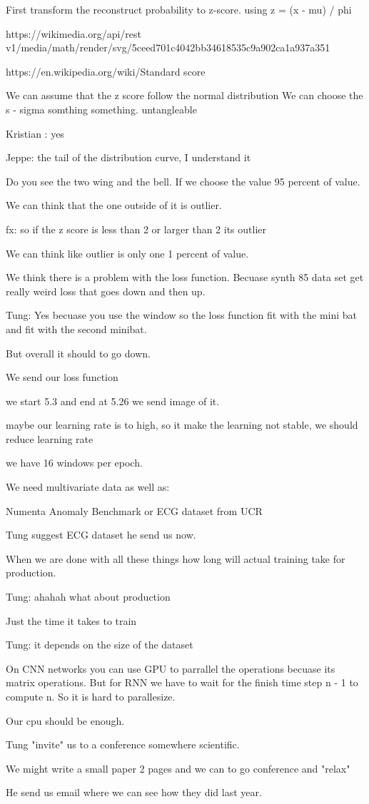 First transform the reconstruct probability to z-score. 
    using z = (x - mu) / phi
    
https://wikimedia.org/api/rest v1/media/math/render/svg/5ceed701c4042bb34618535c9a902ca1a937a351

https://en.wikipedia.org/wiki/Standard score

We can assume that the z score follow the normal distribution
We can choose the s - sigma somthing something. untangleable

Kristian : yes

Jeppe: the tail of the distribution curve, I understand it

Do you see the two wing and the bell. If we choose the value 95 percent of value.

We can think that the one outside of it is outlier.

fx: so if the z score is less than 2 or larger than 2 its outlier

We can think like outlier is only one 1 percent of value.





We think there is a problem with the loss function.
Becuase synth 85 data set get really weird loss that goes down and then up.

Tung: Yes becuase you use the window so the loss function fit with the mini bat and fit with the second minibat.

But overall it should to go down.

We send our loss function

we start 5.3 and end at 5.26 we send image of it. 

maybe our learning rate is to high, so it make the learning not stable, we should reduce learning rate

we have 16 windows per epoch.

We need multivariate data as well as:

Numenta Anomaly Benchmark
or ECG dataset from UCR

Tung suggest ECG dataset he send us now.


When we are done with all these things how long will actual training take for production.

Tung: ahahah what about production

Just the time it takes to train

Tung: it depends on the size of the dataset

On CNN networks you can use GPU to parrallel the operations becuase its matrix operations. But for RNN we have to wait for the finish time step n - 1 to compute n. So it is hard to parallesize.

Our cpu should be enough.

Tung "invite" us to a conference somewhere scientific.

We might write a small paper 2 pages and we can to go conference and "relax"

He send us email where we can see how they did last year.